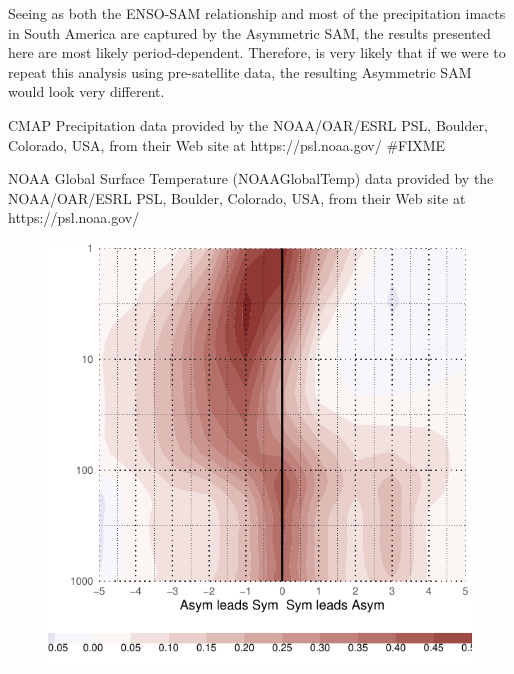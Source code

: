 \documentclass[]{ametsocV5}
\begin{document}
Seeing as both the ENSO-SAM relationship and most of the precipitation
imacts in South America are captured by the Asymmetric SAM, the results
presented here are most likely period-dependent. Therefore, is very
likely that if we were to repeat this analysis using pre-satellite data,
the resulting Asymmetric SAM would look very different.

\acknowledgments

CMAP Precipitation data provided by the NOAA/OAR/ESRL PSL, Boulder,
Colorado, USA, from their Web site at https://psl.noaa.gov/ \#FIXME

NOAA Global Surface Temperature (NOAAGlobalTemp) data provided by the
NOAA/OAR/ESRL PSL, Boulder, Colorado, USA, from their Web site at
https://psl.noaa.gov/



\newpage

\appendix


\begin{figure}
\includegraphics{A1-1} \label{fig:A1}
\end{figure}
\end{document}
